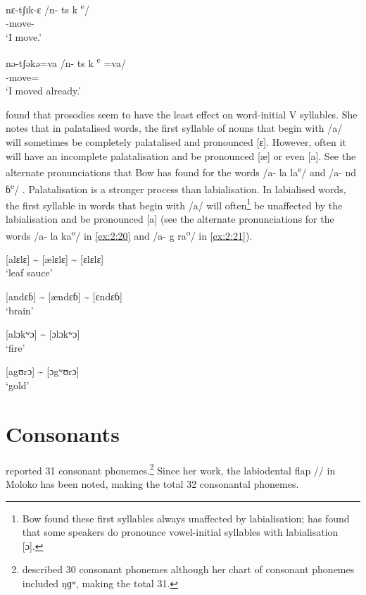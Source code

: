 \ea \label{ex:2:16}
\gll nɛ{}-tʃɪk-ɛ  {\hspace{25pt}}  /n-   ts k \textsuperscript{e}/\\
      {\oneS}-move-{\CL}\\
\glt  ‘I move.’      
\z

\ea \label{ex:2:17}
\gll nə-tʃəkə=va    {\hspace{5pt}} \textup{/n-   ts k \textsuperscript{e}   =va/}\\
      {\oneS}-move={\PRF}\\
\glt  ‘I moved already.’
\z

  \citet{Bow1997c} found that prosodies seem to have the least effect on word-initial V syllables. She notes that in palatalised words, the first syllable of nouns that begin with /a/ will sometimes be completely palatalised and pronounced  [ɛ]. However, often it will have an incomplete palatalisation and be pronounced [æ] or even [a]. See the alternate pronunciations that Bow has found for the words /a- la la\textsuperscript{e}/  and /a- nd ɓ\textsuperscript{e}/ . Palatalisation is a stronger process than labialisation. In labialised words, the first syllable in words that begin with /a/ will often\footnote{Bow found these first syllables always unaffected by labialisation; \citet{Friesen2001} has found that some speakers do pronounce vowel-initial syllables with labialisation [ɔ].} be unaffected by the labialisation and be pronounced [a] (see the alternate pronunciations for the words /a- la ka\textsuperscript{o}/ in \ref{ex:2:20} and /a- g ra\textsuperscript{o}/ in \ref{ex:2:21}). 

\ea \label{ex:2:18}
\textup{[alɛlɛ] {\textasciitilde} [ælɛlɛ] {\textasciitilde} [ɛlɛlɛ]  }\\
\glt  ‘leaf sauce’        
\z

\ea \label{ex:2:19}
\textup{[andɛɓ] {\textasciitilde} [ændɛɓ] {\textasciitilde} [ɛndɛɓ]}\\
\glt  ‘brain’
\z

\ea \label{ex:2:20}
 \textup{[alɔkʷɔ}] {\textasciitilde} [ɔlɔkʷɔ] \\
\glt  ‘fire’        
\z

\ea \label{ex:2:21}
\textup{[agʊrɔ] {\textasciitilde} [ɔgʷʊrɔ]}\\
\glt  ‘gold’
\z

\section{Consonants}\label{sec:2.2}
\hypertarget{RefHeading1210441525720847}{}
\citet{Bow1997c} reported 31 consonant phonemes{.}\footnote{\citet{Bow1997c} described 30 consonant phonemes although her chart of consonant phonemes included ŋɡʷ, making the total 31.} Since her work, the labiodental flap /\dentalflap / in Moloko has been noted, making the total 32 consonantal phonemes.  

